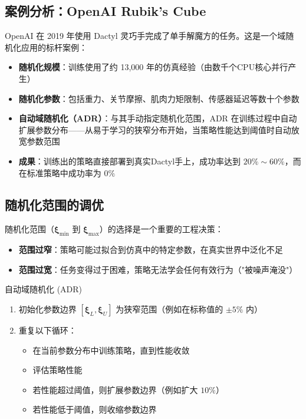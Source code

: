 \subsection{案例分析：OpenAI Rubik's Cube}

OpenAI 在 2019 年使用 Dactyl 灵巧手完成了单手解魔方的任务。这是一个域随机化应用的标杆案例：

\begin{itemize}
    \item \textbf{随机化规模}：训练使用了约 13,000 年的仿真经验（由数千个CPU核心并行产生）
    \item \textbf{随机化参数}：包括重力、关节摩擦、肌肉力矩限制、传感器延迟等数十个参数
    \item \textbf{自动域随机化（ADR）}：与其手动指定随机化范围，ADR 在训练过程中自动扩展参数分布——从易于学习的狭窄分布开始，当策略性能达到阈值时自动放宽参数范围
    \item \textbf{成果}：训练出的策略直接部署到真实Dactyl手上，成功率达到 $20\%\sim60\%$，而在标准策略中成功率为 $0\%$
\end{itemize}

\subsection{随机化范围的调优}

随机化范围（$\boldsymbol{\xi}_{\min}$ 到 $\boldsymbol{\xi}_{\max}$）的选择是一个重要的工程决策：

\begin{itemize}
    \item \textbf{范围过窄}：策略可能过拟合到仿真中的特定参数，在真实世界中泛化不足
    \item \textbf{范围过宽}：任务变得过于困难，策略无法学会任何有效行为（"被噪声淹没"）
\end{itemize}

\begin{myalgorithm}{自动域随机化 (ADR)}
\begin{enumerate}
    \item 初始化参数边界 $[\boldsymbol{\xi}_L, \boldsymbol{\xi}_U]$ 为狭窄范围（例如在标称值的 $\pm 5\%$ 内）
    \item 重复以下循环：
    \begin{itemize}
        \item 在当前参数分布中训练策略，直到性能收敛
        \item 评估策略性能
        \item 若性能超过阈值，则扩展参数边界（例如扩大 $10\%$）
        \item 若性能低于阈值，则收缩参数边界
    \end{itemize}
\end{enumerate}
\end{myalgorithm}

